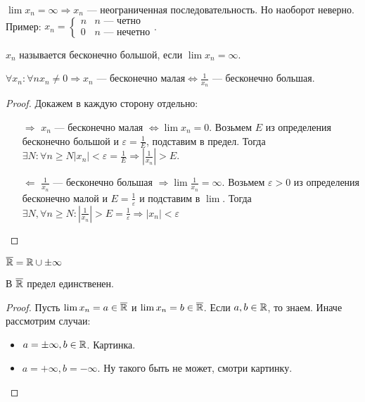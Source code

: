 \begin{remark}
    $\lim x_n = \infty \Rightarrow x_n$ --- неограниченная последовательность. Но наоборот неверно. Пример: $x_n = \begin{cases} n & n\text{ --- четно} \\ 0 & n\text{ --- нечетно}\end{cases}$.
\end{remark}
\begin{definition}
    $x_n$ называется бесконечно большой, если  $\lim x_n = \infty$.
\end{definition}
\begin{theorem}
    $\forall x_n: \forall n x_n \neq 0 \Rightarrow x_n\text{ --- бесконечно малая} \iff \frac{1}{x_n}$ --- бесконечно большая.
\end{theorem}
\begin{proof}
    Докажем в каждую сторону отдельно:
    \begin{itemize}
        \item[$\Rightarrow$] $x_n$ --- бесконечно малая  $\iff \lim x_n=0$. Возьмем  $E$ из определения бесконечно большой и  $\varepsilon = \frac{1}{E}$, подставим в предел. Тогда $\exists N: \forall n \ge N|x_n| < \varepsilon = \frac{1}{E} \Rightarrow |\frac{1}{x_n}| > E$.
        \item[$\Leftarrow$] $\frac{1}{x_n}$ --- бесконечно большая $\Rightarrow \lim \frac{1}{x_n} = \infty$. Возьмем $\varepsilon > 0$ из определения бесконечно малой и  $E = \frac{1}{\varepsilon}$ и подставим в $\lim$. Тогда $\exists N, \forall n \ge N: |\frac{1}{x_n}| >E=\frac{1}{\varepsilon} \Rightarrow |x_n| < \varepsilon$
    \end{itemize}
\end{proof}
\begin{definition}
    $\overline{\mathbb{R}} = \mathbb{R} \cup {\pm \infty}$
\end{definition}
\begin{theorem}
    В $\overline{\mathbb{R}}$ предел единственен.
\end{theorem}
\begin{proof}
    Пусть $\lim x_n = a \in \overline{\mathbb{R}}$ и  $\lim x_n = b \in \overline{\mathbb{R}}$. Если  $a, b \in \mathbb{R}$, то знаем. Иначе рассмотрим случаи:
     \begin{itemize}
         \item $a = \pm \infty, b \in \mathbb{R}$. Картинка.
         \item  $a = +\infty, b = -\infty$. Ну такого быть не может, смотри картинку.
    \end{itemize}
\end{proof}

